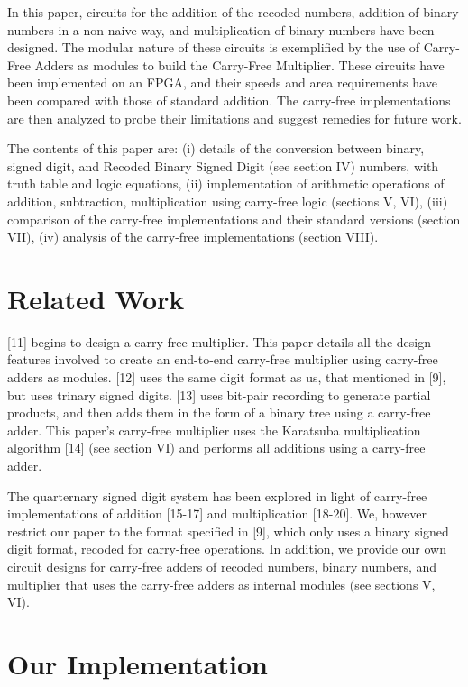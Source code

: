 \documentclass[conference]{IEEEtran}
\begin{document}
In this paper, circuits for the addition of the recoded numbers, addition of binary numbers in a non-naive way, and multiplication of binary numbers have been designed. The modular nature of these circuits is exemplified by the use of Carry-Free Adders as modules to build the Carry-Free Multiplier. These circuits have been implemented on an FPGA, and their speeds and area requirements have been compared with those of standard addition. The carry-free implementations are then analyzed to probe their limitations and suggest remedies for future work.

The contents of this paper are: (i) details of the conversion between binary, signed digit, and Recoded Binary Signed Digit (see section IV) numbers, with truth table and logic equations, (ii) implementation of arithmetic operations of addition, subtraction, multiplication using carry-free logic (sections V, VI), (iii) comparison of the carry-free implementations and their standard versions (section VII), (iv) analysis of the carry-free implementations (section VIII).


\section{Related Work}

[11] begins to design a carry-free multiplier. This paper details all the design features involved to create an end-to-end carry-free multiplier using carry-free adders as modules. [12] uses the same digit format as us, that mentioned in [9], but uses trinary signed digits. [13] uses bit-pair recording to generate partial products, and then adds them in the form of a binary tree using a carry-free adder. This paper's carry-free multiplier uses the Karatsuba multiplication algorithm [14] (see section VI) and performs all additions using a carry-free adder.

The quarternary signed digit system has been explored in light of carry-free implementations of addition [15-17] and multiplication [18-20]. We, however restrict our paper to the format specified in [9], which only uses a binary signed digit format, recoded for carry-free operations. In addition, we provide our own circuit designs for carry-free adders of recoded numbers, binary numbers, and multiplier that uses the carry-free adders as internal modules (see sections V, VI).


\section{Our Implementation}
\end{document}
